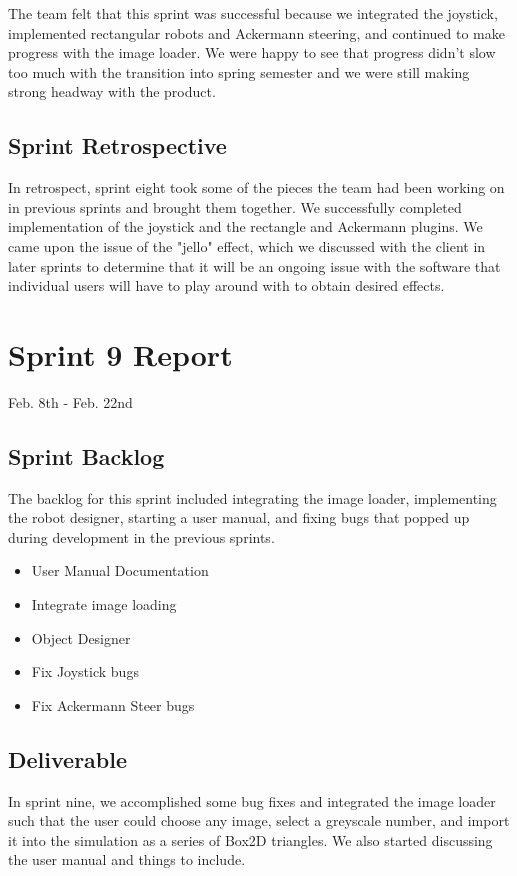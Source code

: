 The team felt that this sprint was successful because we integrated the joystick, implemented rectangular robots and Ackermann steering, and continued to make progress with the image loader. We were happy to see that progress didn't slow too much with the transition into spring semester and we were still making strong headway with the product.

\subsection{Sprint Retrospective}

In retrospect, sprint eight took some of the pieces the team had been working on in previous sprints and brought them together. We successfully completed implementation of the joystick and the rectangle and Ackermann plugins. We came upon the issue of the "jello" effect, which we discussed with the client in later sprints to determine that it will be an ongoing issue with the software that individual users will have to play around with to obtain desired effects.

\section{Sprint 9 Report}
Feb. 8th - Feb. 22nd
\subsection{Sprint Backlog}

The backlog for this sprint included integrating the image loader, implementing the robot designer, starting a user manual, and fixing bugs that popped up during development in the previous sprints.

\begin{itemize}
	\item User Manual Documentation
	\item Integrate image loading
	\item Object Designer	
	\item Fix Joystick bugs
	\item Fix Ackermann Steer bugs
\end{itemize}

\subsection{Deliverable}

In sprint nine, we accomplished some bug fixes and integrated the image loader such that the user could choose any image, select a greyscale number, and import it into the simulation as a series of Box2D triangles. We also started discussing the user manual and things to include.

